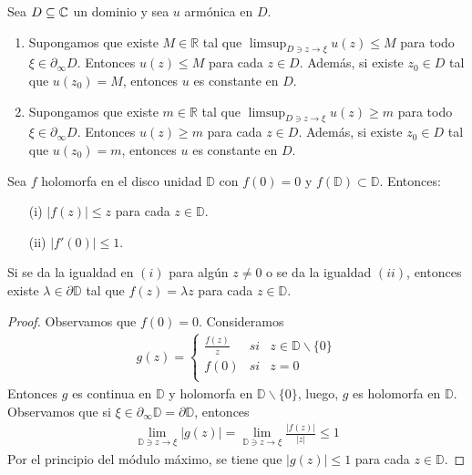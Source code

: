 \begin{teo}
    Sea $D \subseteq \mathbb{C}$ un dominio y sea $u$ armónica en $D$.
    \begin{enumerate}
        \item Supongamos que existe $M \in \mathbb{R}$ tal que $\limsup_{D \ni z \to \xi} u(z) \leq M$ para todo $\xi \in \partial_{\infty} D$. Entonces $u(z) \leq M$ para cada $z \in D$. Además, si existe $z_0 \in D$ tal que $u(z_0) = M$, entonces $u$ es constante en $D$.
        \item Supongamos que existe $m \in \mathbb{R}$ tal que $\limsup_{D \ni z \to \xi} u(z) \ge m$ para todo $\xi \in \partial_{\infty} D$. Entonces $u(z) \ge m$ para cada $z \in D$. Además, si existe $z_0 \in D$ tal que $u(z_0) = m$, entonces $u$ es constante en $D$.
    \end{enumerate}
\end{teo}

\begin{teo}
    Sea $f$ holomorfa en el disco unidad $\mathbb{D}$ con $f(0) = 0$ y $f(\mathbb{D}) \subset \mathbb{D}$. Entonces:
    \begin{enumerate}
        \item[(i)] $|f(z)| \leq z$ para cada $z \in \mathbb{D}$.
        \item[(ii)] $|f'(0)| \leq 1$.
    \end{enumerate}
    Si se da la igualdad en $(i)$ para algún $z \not = 0$ o se da la igualdad $(ii)$, entonces existe $\lambda \in \partial \mathbb{D}$ tal que $f(z) = \lambda z$ para cada $z \in \mathbb{D}$.
\end{teo}

\begin{proof}
    Observamos que $f(0) = 0$. Consideramos
    \begin{align*}
        g(z) = \left\{ \begin{array}{lcc}
                           \frac{f(z)}{z} & si & z \in \mathbb{D} \backslash \{0\} \\
                           f(0)           & si & z = 0                             \\
                       \end{array}
        \right.
    \end{align*}
    Entonces $g$ es continua en $\mathbb{D}$ y holomorfa en $\mathbb{D} \backslash\{0\}$, luego, $g$ es holomorfa en $\mathbb{D}$. Observamos que si $\xi \in \partial_{\infty} \mathbb{D} = \partial \mathbb{D}$, entonces
    \begin{align*}
        \lim_{\mathbb{D} \ni z \to \xi} |g(z)| = \lim_{\mathbb{D} \ni z \to \xi} \frac{|f(z)|}{|z|} \leq 1
    \end{align*}
    Por el principio del módulo máximo, se tiene que $|g(z)| \leq 1$ para cada $z \in \mathbb{D}$.
\end{proof}

